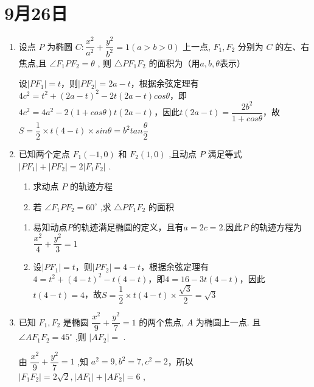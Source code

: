 \section*{9月26日}
\begin{enumerate}
    \item 设点 $P$ 为椭圆 $C : \dfrac{{x}^{2}}{{a}^{2}} + \dfrac{{y}^{2}}{b^2} = 1\left( {a > b > 0}\right)$ 上一点, ${F}_{1},{F}_{2}$ 分别为 $C$ 的左、右焦点,且 $\angle {F}_{1}P{F}_{2} = \theta$ , 则 $\bigtriangleup  P{F}_{1}{F}_{2}$ 的面积为（用$a, b, \theta$表示）
    \begin{jieda}
        设$|PF_1| = t$，则$|PF_2| = 2a-t$，根据余弦定理有$4c^2 = t^2 + (2a-t)^2 - 2t(2a-t)cos\theta$，即$4c^2 = 4a^2 - 2(1+cos\theta)t(2a-t)$，因此$t(2a-t) = \dfrac{2b^2}{1+cos\theta}$，故$S = \dfrac{1}{2} \times t(4-t) \times sin\theta = b^2tan\dfrac{\theta}{2}$
    \end{jieda}

    \item 已知两个定点 ${F}_{1}\left( {-1,0}\right)$ 和 ${F}_{2}\left( {1,0}\right)$ ,且动点 $P$ 满足等式 $\left| {P{F}_{1}}\right|  + \left| {P{F}_{2}}\right|  = 2\left| {{F}_{1}{F}_{2}}\right|$ .
    \begin{enumerate}
        \item 求动点 $P$ 的轨迹方程
        \item 若 $\angle {F}_{1}P{F}_{2} = {60}^{ \circ  }$ ,求 $\bigtriangleup P{F}_{1}{F}_{2}$ 的面积
    \end{enumerate}
    \begin{jieda}
        \begin{enumerate}
            \item 易知动点$P$的轨迹满足椭圆的定义，且有$a = 2c = 2$.因此$P$ 的轨迹方程为$\dfrac{x^2}{4} + \dfrac{y^2}{3} = 1$
            \item 设$|PF_1| = t$，则$|PF_2| = 4-t$，根据余弦定理有$4 = t^2 + (4-t)^2 - t(4-t)$，即$4 = 16 - 3t(4-t)$，因此$t(4-t) = 4$，故$S = \dfrac{1}{2} \times t(4-t) \times \dfrac{\sqrt{3}}{2} = \sqrt{3}$
        \end{enumerate}
    \end{jieda}
    \item 已知 ${F}_{1},{F}_{2}$ 是椭圆 $\dfrac{{x}^{2}}{9} + \dfrac{{y}^{2}}{7} = 1$ 的两个焦点, ${A}$ 为椭圆上一点. 且 $\angle A{F}_{1}{F}_{2} = {45}^{ \circ  }$ ,则 $\left| {A{F}_{2}}\right|  =$ .
    \begin{jieda}
        由 $\dfrac{{x}^{2}}{9} + \dfrac{{y}^{2}}{7} = 1$ ,知 ${a}^{2} = 9,{b}^{2} = 7,{c}^{2} = 2$，所以 $\left| {{F}_{1}{F}_{2}}\right|  = 2\sqrt{2},\left| {A{F}_{1}}\right|  + \left| {A{F}_{2}}\right|  = 6$ ,
        

\end{jieda}
\end{enumerate}
